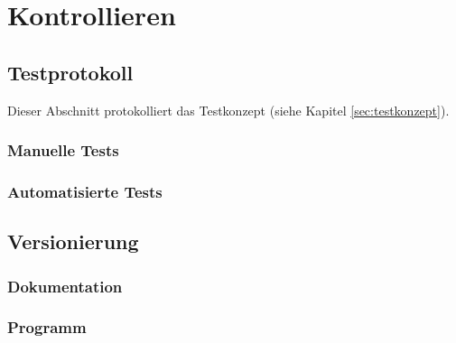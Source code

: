 \chapter{Kontrollieren}
\section{Testprotokoll}
Dieser Abschnitt protokolliert das Testkonzept (siehe Kapitel \ref{sec:testkonzept}).
\subsection{Manuelle Tests}
\subsection{Automatisierte Tests}

\section{Versionierung}
\subsection{Dokumentation}
\subsection{Programm}
